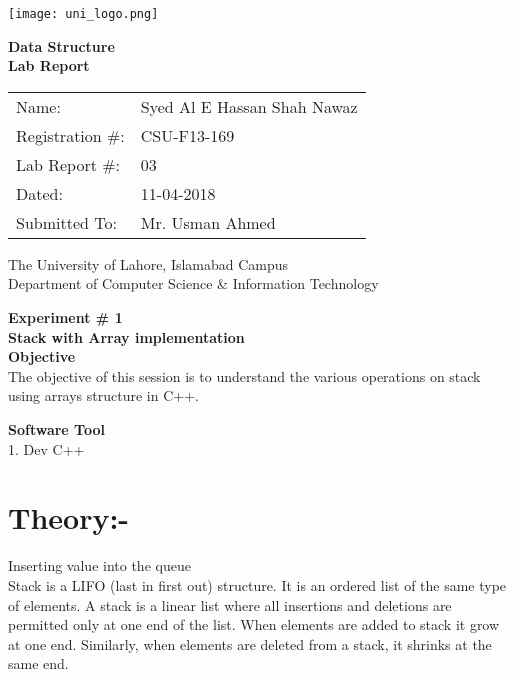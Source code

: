 \documentclass[11pt]{article}            %
\begin{document}
\begin{titlepage}
    \centering
  \vfill
    \texttt{[image: uni\_logo.png]} \\ 
	\vskip2cm
    {\bfseries\Large
	Data Structure \\ 
	
	\vskip2cm
	Lab Report 
	 
	\vskip2cm
	}    

\begin{center}
\begin{tabular}{ l l  } 

Name: & Syed Al E Hassan Shah Nawaz \\ 
Registration \#:& CSU-F13-169 \\ 
Lab Report \#: & 03 \\ 
 Dated:& 11-04-2018\\ 
Submitted To:& Mr. Usman Ahmed\\ 

\end{tabular}
\end{center}
    \vfill
    The University of Lahore, Islamabad Campus\\
Department of Computer Science \& Information Technology
\end{titlepage}


    
    {\bfseries\Large
\centering
	Experiment \# 1 \\

Stack with Array implementation\\
	
	}    
 \vskip1cm
 \textbf {Objective}\\  The objective of this session is to understand the various operations on stack using arrays structure in C++. 
 
 \textbf {Software Tool} \\
1. Dev C++ \\
\section{Theory:-} 
{Inserting value into the queue}\\

Stack is a LIFO (last in first out) structure. It is an ordered list of the same type of elements. A stack is a linear list where all insertions and deletions are permitted only at one end of the list. When elements are added to stack it grow at one end. Similarly, when elements are deleted from a stack, it shrinks at the same end.
\end{document}

